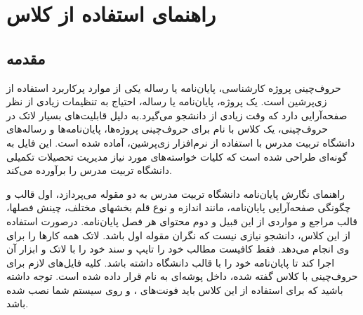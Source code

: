 
\chapter{راهنمای استفاده از کلاس}
\thispagestyle{empty}
\section{مقدمه }
حروف‌چینی پروژه کارشناسی، پایان‌نامه یا رساله یکی از موارد پرکاربرد استفاده از زی‌پرشین\cite{Khalighi87xepersian} است.  یک پروژه، پایان‌نامه یا رساله،  احتیاج به تنظیمات زیادی از نظر صفحه‌آرایی  دارد که وقت زیادی از دانشجو می‌گیرد.به دلیل قابلیت‌های بسیار لاتک در حروف‌چینی، یک کلاس با نام 
 برای حروف‌چینی پروژه‌ها، پایان‌نامه‌ها و رساله‌های دانشگاه تربیت مدرس با استفاده از نرم‌افزار زی‌پرشین،  آماده شده است. این فایل به 
گونه‌ای طراحی شده است که کلیات خواسته‌های مورد نیاز  مدیریت تحصیلات تکمیلی دانشگاه تربیت مدرس \cite{IUSTThesisGuide} را برآورده می‌کند.%

راهنمای نگارش پایان‌نامه دانشگاه تربیت مدرس به دو مقوله می‌پردازد، اول قالب و چگونگی صفحه‌آرایی پایان‌نامه، مانند اندازه و نوع قلم بخشهای مختلف، چینش فصلها، قالب مراجع و مواردی از این قبیل و دوم محتوای هر فصل پایان‌نامه. 
درصورت استفاده از این کلاس، دانشجو  نیازی نیست که نگران مقوله اول باشد. لاتک همه کارها را برای وی انجام می‌دهد. فقط کافیست مطالب خود را تایپ و سند خود را با لاتک و ابزار آن اجرا کند تا پایان‌نامه خود را با قالب دانشگاه داشته باشد.
کلیه فایل‌های لازم برای حروف‌چینی با کلاس گفته شده، داخل پوشه‌ای به نام
  قرار داده شده است. توجه داشته باشید که برای استفاده از این کلاس باید فونت‌های
  ،
 و
    روی سیستم شما نصب شده باشد.
